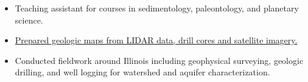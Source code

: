 \begin{itemize}
\item Teaching assistant for courses in sedimentology, paleontology, and planetary science.
\end{itemize}

\begin{itemize}
\item \href{http://www.isgs.illinois.edu/sites/isgs/files/maps/isgs-quads/aurora-south-sg.pdf}{Prepared geologic maps from LIDAR data, drill cores and satellite imagery.}
\item Conducted fieldwork around Illinois including geophysical surveying, geologic drilling, and well logging for watershed and aquifer characterization. 
\end{itemize}
